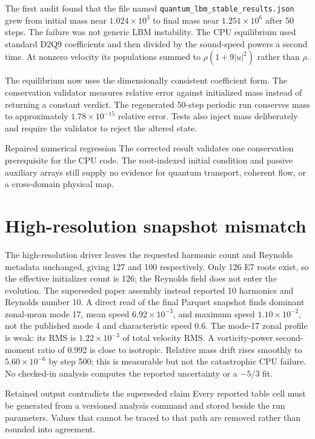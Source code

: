 The first audit found that the file named
\texttt{quantum\_lbm\_stable\_results.json} grew from initial mass near
$1.024\times10^3$ to final mass near $1.251\times10^6$ after 50 steps. The
failure was not generic LBM instability. The CPU equilibrium used standard
D2Q9 coefficients and then divided by the sound-speed powers a second time.
At nonzero velocity its populations summed to $\rho(1+9|u|^2)$ rather than
$\rho$.

The equilibrium now uses the dimensionally consistent coefficient form. The
conservation validator measures relative error against initialized mass instead
of returning a constant verdict. The regenerated 50-step periodic run conserves
mass to approximately $1.78\times10^{-15}$ relative error. Tests also inject
mass deliberately and require the validator to reject the altered state.

\begin{evidence}{Repaired numerical regression}
The corrected result validates one conservation prerequisite for the CPU code.
The root-indexed initial condition and passive auxiliary arrays still supply no
evidence for quantum transport, coherent flow, or a cross-domain physical map.
\end{evidence}

\section{High-resolution snapshot mismatch}

The high-resolution driver leaves the requested harmonic count and Reynolds
metadata unchanged, giving 127 and 100 respectively. Only 126 E7 roots exist,
so the effective initializer count is 126; the Reynolds field does not enter
the evolution. The superseded paper assembly instead reported 10 harmonics and
Reynolds number 10. A direct read of the final Parquet snapshot
finds dominant zonal-mean mode 17, mean speed $6.92\times10^{-3}$, and maximum
speed $1.10\times10^{-2}$, not the published mode 4 and characteristic speed
0.6. The mode-17 zonal profile is weak: its RMS is $1.22\times10^{-3}$ of total
velocity RMS. A vorticity-power second-moment ratio of 0.992 is close to
isotropic. Relative mass drift rises smoothly to $5.60\times10^{-6}$ by step
500; this is measurable but not the catastrophic CPU failure. No checked-in
analysis computes the reported uncertainty or a $-5/3$ fit.

\begin{evidence}{Retained output contradicts the superseded claim}
Every reported table cell must be generated from a versioned analysis command
and stored beside the run parameters. Values that cannot be traced to that path
are removed rather than rounded into agreement.
\end{evidence}

